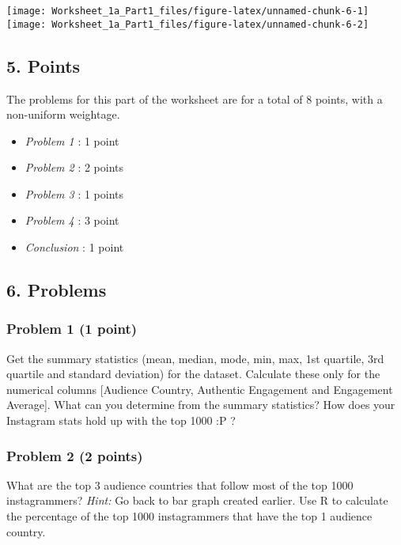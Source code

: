 \documentclass[
]{article}
\providecommand{\tightlist}{%
  \setlength{\itemsep}{0pt}\setlength{\parskip}{0pt}}
\begin{document}
\texttt{[image: Worksheet\_1a\_Part1\_files/figure-latex/unnamed-chunk-6-1]}
\texttt{[image: Worksheet\_1a\_Part1\_files/figure-latex/unnamed-chunk-6-2]}

\hypertarget{points}{%
\subsection{5. Points}\label{points}}

The problems for this part of the worksheet are for a total of 8 points,
with a non-uniform weightage.

\begin{itemize}
\tightlist
\item
  \emph{Problem 1} : 1 point
\item
  \emph{Problem 2} : 2 points
\item
  \emph{Problem 3} : 1 points
\item
  \emph{Problem 4} : 3 point
\item
  \emph{Conclusion} : 1 point
\end{itemize}

\hypertarget{problems}{%
\subsection{6. Problems}\label{problems}}

\hypertarget{problem-1-1-point}{%
\subsubsection{Problem 1 (1 point)}\label{problem-1-1-point}}

Get the summary statistics (mean, median, mode, min, max, 1st quartile,
3rd quartile and standard deviation) for the dataset. Calculate these
only for the numerical columns {[}Audience Country, Authentic Engagement
and Engagement Average{]}. What can you determine from the summary
statistics? How does your Instagram stats hold up with the top 1000 :P ?

\hypertarget{problem-2-2-points}{%
\subsubsection{Problem 2 (2 points)}\label{problem-2-2-points}}

What are the top 3 audience countries that follow most of the top 1000
instagrammers? \emph{Hint:} Go back to bar graph created earlier. Use R
to calculate the percentage of the top 1000 instagrammers that have the
top 1 audience country.
\end{document}
